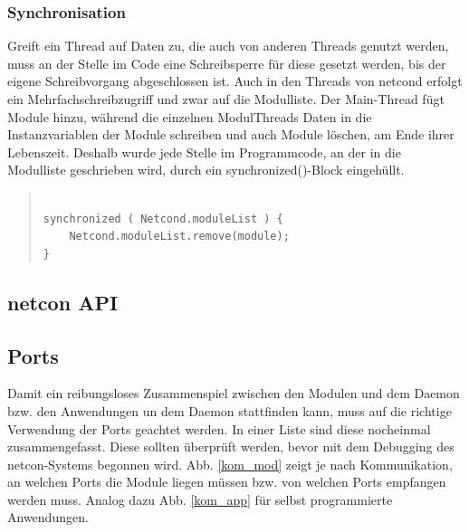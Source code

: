 \documentclass[a4paper,14pt,headsepline]{scrartcl}
\begin{document}
\newpage

\subsubsection*{Synchronisation}

Greift ein Thread auf Daten zu, die auch von anderen Threads genutzt werden, muss an der Stelle im Code eine Schreibsperre für diese gesetzt werden, bis der eigene Schreibvorgang abgeschlossen ist. Auch in den Threads von netcond erfolgt ein Mehrfachschreibzugriff und zwar auf die Modulliste. Der Main-Thread fügt Module hinzu, während die einzelnen ModulThreads Daten in die Instanzvariablen der Module schreiben und auch Module löschen, am Ende ihrer Lebenszeit. Deshalb wurde jede Stelle im Programmcode, an der in die Modulliste geschrieben wird, durch ein synchronized()-Block eingehüllt.    
					
\begin{quote}
\begin{verbatim}

synchronized ( Netcond.moduleList ) {
    Netcond.moduleList.remove(module);
}

\end{verbatim}
\end{quote} 

\newpage

\subsection{netcon API}

\newpage
\subsection{Ports}

Damit ein reibungsloses Zusammenspiel zwischen den Modulen und dem Daemon bzw. den Anwendungen un dem Daemon stattfinden kann, muss auf die richtige Verwendung der Ports geachtet werden. In einer Liste sind diese nocheinmal zusammengefasst. Diese sollten überprüft werden, bevor mit dem Debugging des netcon-Systems begonnen wird. Abb. \ref{kom_mod} zeigt je nach Kommunikation, an welchen Ports die Module liegen müssen bzw. von welchen Ports empfangen werden muss. Analog dazu Abb. \ref{kom_app} für selbst programmierte Anwendungen. 
\end{document}
